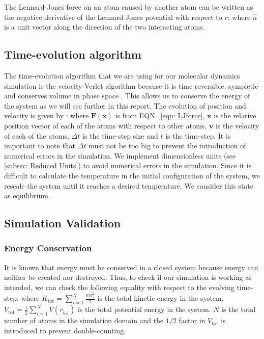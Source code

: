 \documentclass[pra,aps,superscriptaddress,amssymb,amsmath,reprint,noeprint,floatfix]{revtex4-2}
\begin{document}
The Lennard-Jones force on an atom caused by another atom can be written as the negative derivative of the Lennard-Jones potential with respect to $r$:
\LJforce
where $\hat{n}$ is a unit vector along the direction of the two interacting atoms.

\subsection{\label{subsec: Time-evolution algorithm}Time-evolution algorithm}
The time-evolution algorithm that we are using for our molecular dynamics simulation is the velocity-Verlet algorithm because it is time reversible, sympletic and conserves volume in phase space \cite{10.1002/jcc.540150109}. This allows us to conserve the energy of the system as we will see further in this report. The evolution of position and velocity is given by \cite{PhysRev.159.98}:
\Verletalgo
where $\mathbf{F}(\mathbf{x})$ is from EQN.\ \ref{eqn: LJforce}, $\mathbf{x}$ is the relative position vector of each of the atoms with respect to other atoms, $\mathbf{v}$ is the velocity of each of the atoms, $\Delta t$ is the time-step size and $t$ is the time-step. It is important to note that $\Delta t$ must not be too big to prevent the introduction of numerical errors in the simulation. We implement dimensionless units (see \ref{subsec: Reduced Units}) to avoid numerical errors in the simulation. Since it is difficult to calculate the temperature in the initial configuration of the system, we rescale the system until it reaches a desired temperature. We consider this state as equilibrium. 

\subsection{\label{subsec: Simulation validation}Simulation Validation}
\subsubsection{\label{subsubsec: Energy Conservation}Energy Conservation}
It is known that energy must be conserved in a closed system because energy can neither be created nor destroyed. Thus, to check if our simulation is working as intended, we can check the following equality with respect to the evolving time-step.
\PEequalKE
where $K_\mathrm{tot} = \sum_{i=1}^{N} \frac{mv_i^2}{2}$ is the total kinetic energy in the system, $V_\mathrm{tot} = \frac{1}{2}\sum_{i=1}^{N} V(r_{i_\mathrm{rel}})$ is the total potential energy in the system. $N$ is the total number of atoms in the simulation domain and the $1/2$ factor in $V_\mathrm{tot}$ is introduced to prevent double-counting.
\end{document}
